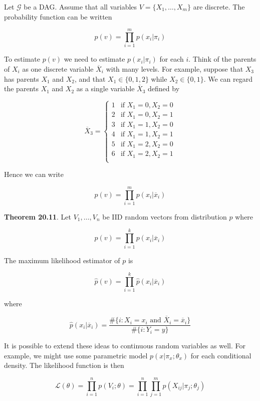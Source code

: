 Let \(\mathcal{G}\) be a DAG. Assume that all variables
\(V = \{ X_{1}, \dots, X_m \}\) are discrete. The probability function can
be written

\[ p(v) = \prod_{i=1}^m p(x_{i} | \pi_{i}) \]

To estimate \(p(v)\) we need to estimate \(p(x_{i} | \pi_{i})\) for each
\(i\). Think of the parents of \(X_{i}\) as one discrete variable
\(\overline{X}_{i}\) with many levels. For example, suppose that \(X_{3}\)
has parents \(X_{1}\) and \(X_{2}\), and that \(X_{1} \in \{ 0, 1, 2 \}\)
while \(X_{2} \in \{ 0, 1 \}\). We can regard the parents \(X_{1}\) and
\(X_{2}\) as a single variable \(\overline{X}_{3}\) defined by

\[ \overline{X}_{3} = \begin{cases}
1 & \text{if } X_{1} = 0, X_{2} = 0\\
2 & \text{if } X_{1} = 0, X_{2} = 1\\
3 & \text{if } X_{1} = 1, X_{2} = 0\\
4 & \text{if } X_{1} = 1, X_{2} = 1\\
5 & \text{if } X_{1} = 2, X_{2} = 0\\
6 & \text{if } X_{1} = 2, X_{2} = 1\\
\end{cases}\]

Hence we can write

\[ p(v) = \prod_{i=1}^m p(x_{i} | \overline{x}_{i}) \]

\textbf{Theorem 20.11}. Let \(V_{1}, \dots, V_{n}\) be IID random vectors
from distribution \(p\) where

\[ p(v) = \prod_{i=1}^{k} p(x_{i} | \overline{x}_{i}) \]

The maximum likelihood estimator of \(p\) is

\[ \hat{p}(v) = \prod_{i=1}^{k} \hat{p}(x_{i} | \overline{x}_{i}) \]

where

\[ \hat{p}(x_{i} | \overline{x}_{i}) = \frac{\# \{i : X_{i} = x_{i} \text{ and } \overline{X}_{i} = \overline{x}_{i} \}}{\# \{i : Y_{i} = y \}} \]

It is possible to extend these ideas to continuous random variables as
well. For example, we might use some parametric model
\(p(x | \pi_x; \theta_x)\) for each conditional density. The likelihood
function is then

\[ \mathcal{L}(\theta) = \prod_{i=1}^{n} p(V_{i}; \theta) = \prod_{i=1}^{n} \prod_{j=1}^m p(X_{ij} | \pi_{j}; \theta_{j}) \]


